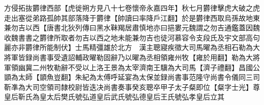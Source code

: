 方侵拓抜欝律西部【虎徙朔方見八十七卷懷帝永嘉四年】秋七月欝律擊虎大破之虎走出塞從弟路孤帥其部落降于欝律【帥讀曰率降戶江翻】於是欝律西取烏孫故地東兼勿吉以西【唐書北狄列傳曰黑水靺羯居肅慎地亦曰挹婁元魏謂之勿吉通鑑蓋因魏收魏書書之欝律所取者勿吉以西之地未能兼勿吉也徒河慕容令支段氏及宇文部高句麗亦非欝律所能制伏】士馬精彊雄於北方　漢主聰寢疾徵大司馬曜為丞相石勒為大將軍皆録尚書事受遺詔輔政曜勒固辭乃以曜為丞相領雍州牧【雍於用翻】勒為大將軍領幽冀二州牧勒辭不受以上洛王景為太宰濟南王驥為大司馬【濟子禮翻】昌國公顗為太師【顗魚豈翻】朱紀為太傅呼延宴為太保並録尚書事范隆守尚書令儀同三司靳凖為大司空領司隸校尉皆迭决尚書奏事癸亥聰卒甲子太子粲即位【粲字士光】尊皇后靳氏為皇太后樊氏號弘道皇后武氏號弘德皇后王氏號弘孝皇后立其